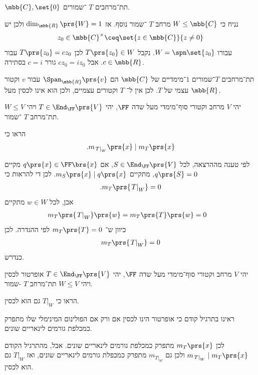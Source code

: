 \documentclass[a4paper,10pt,twoside,openany]{book}
\begin{document}
\begin{solution}
$\mbb{C}, \set{0}$
תת־מרחבים
$T$%
־שמורים.

נניח כי
$W \leq \mbb{C}$
מרחב
$T$%
־שמור נוסף. אז
$\dim_{\mbb{R}}\prs{W} = 1$
ולכן יש
\[z_0 \in \mbb{C}^\times \ceq \set{z \in \mbb{C}}{z \neq 0}\]
עבורו
$W = \spn\set{z_0}$.
נקבל
$T\prs{z_0} \in W$
לכן
$T\prs{z_0} = c z_0$
עבור
$c \in \mbb{R}$.
אבל
$c z_0 = i z_0$
גורר
$c = i$
בסתירה.

תת־מרחבים $T$־שמורים $1$־מימדיים של
$\mbb{C}$
הם
$\Span_{\mbb{R}}\prs{v}$
עבור
$v$
וקטור עצמי של
$T$.
 לכן אין ל־%
$T$
וקטורים עצמיים, ולכן הוא אינו לכסין מעל
$\mbb{R}$.
\end{solution}

\begin{exercisechap}
יהי
$V$
מרחב וקטורי סוף־מימדי מעל שדה
$\FF$,
יהי
$T \in \End_\FF\prs{V}$
ויהי
$W \leq V$
תת־מרחב
$T$%
־שמור.

הראו כי
\[\text{.} m_{\left. T \right|_W}\prs{x} \mid m_T\prs{x}\]
\end{exercisechap}

\begin{solution}
לפי טענה מההרצאה, לכל
$S \in \End_\FF\prs{V}$,
אם
$q\prs{x} \in \FF\brs{x}$
מקיים
$q\prs{S} = 0$,
מתקיים
$m_S\prs{x} \mid q\prs{x}$.
לכן די להראות כי
\begin{align*}
\text{.} m_T\prs{\left. T \right|_W} = 0
\end{align*}
אכן, לכל
$w \in W$
מתקיים
\begin{align*}
m_T\prs{\left. T \right|_W}\prs{w}
&=
m_T\prs{T}\prs{w}
= 0
\end{align*}
כיוון ש־%
$m_T\prs{T} = 0$
לפי ההגדרה.
לכן
\begin{align*}
m_T\prs{\left. T \right|_W} = 0
\end{align*}
כנדרש.
\end{solution}

\begin{exercisechap}
יהי
$V$
מרחב וקטורי סוף־מימדי מעל שדה
$\FF$,
יהי
$T \in \End_\FF\prs{V}$
אופרטור לכסין
ויהי
$W \leq V$
תת־מרחב
$T$%
-שמור.

הראו כי
$\left. T \right|_W$
גם הוא לכסין.
\end{exercisechap}

\begin{solution}
ראינו בתרגיל קודם כי אופרטור הינו לכסין אם ורק אם הפולינום המינימלי שלו מתפרק כמכלפת גורמים לינאריים שונים.

לכן
$m_T\prs{x}$
מתפרק כמכלפת גורמים לינאריים שונים. אבל, מהתרגיל הקודם
$m_{\left. T \right|_W} \mid m_T\prs{x}$
ולכן גם
$m_{\left. T \right|_W}$
מתפרק כמכפלת גורמים לינאריים שונים, ואז
$\left. T \right|_W$
גם הוא לכסין.
\end{solution}
\end{document}
